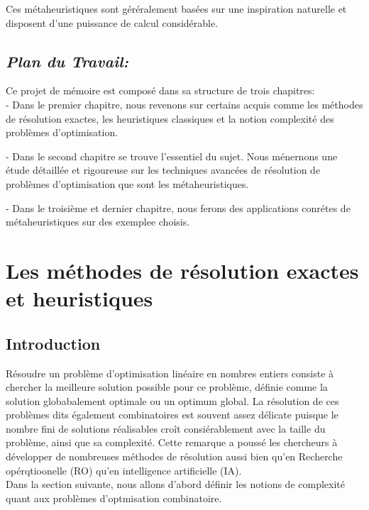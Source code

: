 \documentclass[a4paper,11pt,oneside]{report}
\theoremstyle{plain}
\newcommand{\0}{/ \! \! \! 0}
\theoremstyle{plain}
\begin{document}
Ces m\'etaheuristiques sont g\'er\'eralement bas\'ees sur une inspiration naturelle et disposent d'une puissance de calcul consid\'erable.  

\section*{\it Plan du Travail:}
Ce projet de m\'emoire est compos\'e dans sa structure de trois chapitres:\\
 
 - Dans le premier chapitre, nous revenons sur certains acquis comme les m\'ethodes de r\'esolution exactes, les heuristiques classiques et la notion 
 complexit\'e des probl\`emes d'optimisation.

 - Dans le second chapitre se trouve l'essentiel du sujet. Nous m\'enernons une \'etude d\'etaill\'ee et rigoureuse sur les techniques avanc\'ees 
 de r\'esolution de probl\`emes d'optimisation que sont les m\'etaheuristiques.
 
 - Dans le troisi\`eme et dernier chapitre, nous ferons des applications conr\'etes de m\'etaheuristiques sur des exemplee choisis.

\chapter{Les m\'ethodes de r\'esolution exactes et heuristiques}
\section{Introduction}
R\'esoudre un probl\`eme d'optimisation lin\'eaire en nombres entiers consiste \`a chercher la meilleure solution possible pour ce probl\`eme, 
d\'efinie comme la solution globabalement optimale ou un optimum global. La r\'esolution de ces probl\`emes dits \'egalement combinatoires est
souvent assez d\'elicate puisque le nombre fini de solutions r\'ealisables cro\^it consi\'erablement avec la taille du probl\`eme, ainsi que sa 
complexit\'e. Cette remarque a pouss\'e les chercheurs \`a d\'evelopper de nombreuses m\'ethodes de r\'esolution aussi bien qu'en Recherche op\'erqtioonelle
(RO) qu'en intelligence artificielle (IA).\\
Dans la section suivante, nous allons d'abord d\'efinir les notions de complexit\'e quant aux probl\`emes d'optmisation combinatoire.
\end{document}
